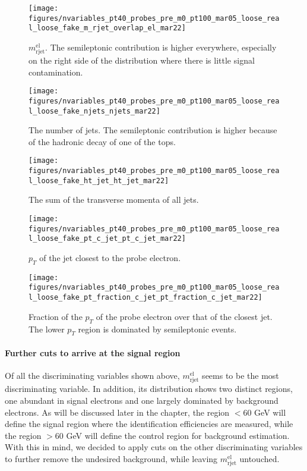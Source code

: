 \begin{figure}[H]
	\texttt{[image: figures/nvariables\_pt40\_probes\_pre\_m0\_pt100\_mar05\_loose\_real\_loose\_fake\_m\_rjet\_overlap\_el\_mar22]}
	\centering
	\caption{$m_{\text{rjet}}^{\text{el}}$. The semileptonic contribution is higher everywhere, especially on the right side of the distribution where
		there is little signal contamination.}
	\label{f:premrjet}
\end{figure}

\begin{figure}[H]
	\texttt{[image: figures/nvariables\_pt40\_probes\_pre\_m0\_pt100\_mar05\_loose\_real\_loose\_fake\_njets\_njets\_mar22]}
	\centering
	\caption{The number of jets. The semileptonic contribution is higher because of the hadronic decay of one of the tops.}
	\label{f:prenjets}
\end{figure}

\begin{figure}[H]
	\texttt{[image: figures/nvariables\_pt40\_probes\_pre\_m0\_pt100\_mar05\_loose\_real\_loose\_fake\_ht\_jet\_ht\_jet\_mar22]}
	\centering
	\caption{The sum of the transverse momenta of all jets.}
	\label{f:prehtjet}
\end{figure}


\begin{figure}[H]
	\texttt{[image: figures/nvariables\_pt40\_probes\_pre\_m0\_pt100\_mar05\_loose\_real\_loose\_fake\_pt\_c\_jet\_pt\_c\_jet\_mar22]}
	\centering
	\caption{$p_T$ of the jet closest to the probe electron. }
	\label{f:preptcjet}
\end{figure}


\begin{figure}[H]
	\texttt{[image: figures/nvariables\_pt40\_probes\_pre\_m0\_pt100\_mar05\_loose\_real\_loose\_fake\_pt\_fraction\_c\_jet\_pt\_fraction\_c\_jet\_mar22]}
	\centering
	\caption{Fraction of the $p_T$ of the probe electron over that of the closest jet. The lower $p_T$ region is dominated by semileptonic events.}
	\label{f:preptfractioncjet}
\end{figure}

\paragraph{Further cuts to arrive at the signal region}\label{p:eidfurthercuts}

Of all the discriminating variables shown above, $m_{\text{rjet}}^{\text{el}}$
seems to be the most discriminating variable. In addition, its distribution
shows two distinct regions, one abundant in signal electrons and one largely
dominated by background electrons. As will be discussed later in the chapter,
the region $< 60$ GeV will define the signal region where the identification
efficiencies are measured, while the region $> 60$ GeV will define the control
region for background estimation. With this in mind, we decided to apply cuts
on the other discriminating variables to further remove the undesired
background, while leaving $m_{\text{rjet}}^{\text{el}}$ untouched.

